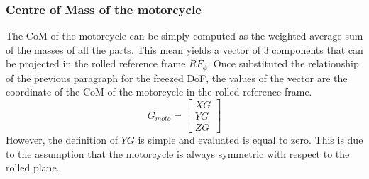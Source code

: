 \subsubsection{Centre of Mass of the motorcycle}
%
The CoM of the motorcycle can be simply computed as the weighted average sum of the masses of all the parts. This mean yields a vector of 3 components that can be projected in the rolled reference frame $RF_\phi$. Once substituted the relationship of the previous paragraph for the freezed DoF, the values of the vector are the coordinate of the CoM of the motorcycle in the rolled reference frame. 
\begin{equation}
    \label{eq:CoM}
    G_{moto} = 
    \left[ \begin{array}{c}
        XG\\
        YG\\
        ZG
    \end{array} \right]
\end{equation}
However, the definition of $YG$ is simple and evaluated is equal to zero. This is due to the assumption that the motorcycle is always symmetric with respect to the rolled plane.
%
